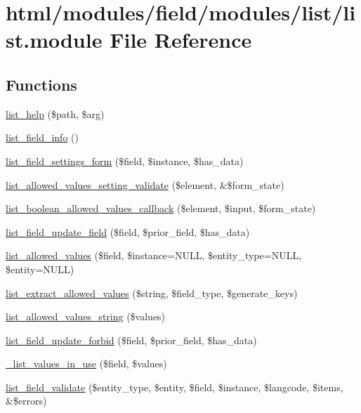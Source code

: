 \hypertarget{list_8module}{
\section{html/modules/field/modules/list/list.module File Reference}
\label{list_8module}
}
\subsection*{Functions}
\begin{DoxyCompactItemize}
\item 
\hyperlink{list_8module_a46b480544753f929da4823a51ec5693e}{list\_\-help} (\$path, \$arg)
\item 
\hyperlink{list_8module_a063622318fd99746c6ea7b806334d006}{list\_\-field\_\-info} ()
\item 
\hyperlink{list_8module_a17f5bcfffcb1264c027462c2d931f71e}{list\_\-field\_\-settings\_\-form} (\$field, \$instance, \$has\_\-data)
\item 
\hyperlink{list_8module_a87f1b0175d4b11b5d441e3b512749b58}{list\_\-allowed\_\-values\_\-setting\_\-validate} (\$element, \&\$form\_\-state)
\item 
\hyperlink{list_8module_add00f68e77cd0894cdb7d41fcbed95f0}{list\_\-boolean\_\-allowed\_\-values\_\-callback} (\$element, \$input, \$form\_\-state)
\item 
\hyperlink{list_8module_affec6e81ffd24248ec77ad48fb659e78}{list\_\-field\_\-update\_\-field} (\$field, \$prior\_\-field, \$has\_\-data)
\item 
\hyperlink{list_8module_a218d8f625fd18ca24e8cf7e3770bc576}{list\_\-allowed\_\-values} (\$field, \$instance=NULL, \$entity\_\-type=NULL, \$entity=NULL)
\item 
\hyperlink{list_8module_afcca93c49a8a373704672f52fae831a6}{list\_\-extract\_\-allowed\_\-values} (\$string, \$field\_\-type, \$generate\_\-keys)
\item 
\hyperlink{list_8module_a398a1526738a574db51cad98a20b5590}{list\_\-allowed\_\-values\_\-string} (\$values)
\item 
\hyperlink{list_8module_a358175e4b86e8774e0c60d827bbe8367}{list\_\-field\_\-update\_\-forbid} (\$field, \$prior\_\-field, \$has\_\-data)
\item 
\hyperlink{list_8module_a0b84a7d7dd9ccad6ee17784192eb5b9b}{\_\-list\_\-values\_\-in\_\-use} (\$field, \$values)
\item 
\hyperlink{list_8module_accbb5465b471c4b4e888dd703f34fc45}{list\_\-field\_\-validate} (\$entity\_\-type, \$entity, \$field, \$instance, \$langcode, \$items, \&\$errors)

\end{DoxyCompactItemize}
